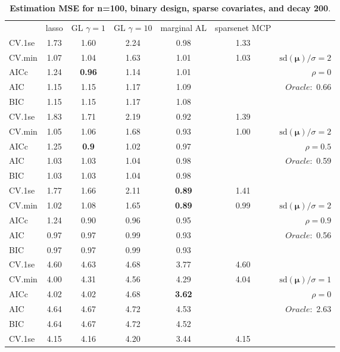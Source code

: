 \begin{table}\vspace{-.5cm}
\caption[l]{ { \bf Estimation MSE for n=100, binary design, 
sparse covariates, and  decay  200}.}
\vspace{-.5cm}
\footnotesize{}
\begin{center}
\begin{tabular}{l*{5}{c}|r}
& lasso & GL $\gamma=1$ & GL $\gamma=10$ & marginal AL & sparsenet MCP  & \\
 \cline{1-7}
CV.1se & 1.73 & 1.60 & 2.24 & 0.98 & 1.33 & \\
CV.min & 1.07 & 1.04 & 1.63 & 1.01 & 1.03 &  $\mathrm{sd}(\mathbf{\mu})/\sigma=2$ \\
AICc & 1.24 & {\bf 0.96} & 1.14 & 1.01 & & $\rho=0$ \\
AIC & 1.15 & 1.15 & 1.17 & 1.09 & &  \multirow{2}{*}{$Oracle: $ 0.66} \\
BIC & 1.15 & 1.15 & 1.17 & 1.08 & &  \\
 \hline 
CV.1se & 1.83 & 1.71 & 2.19 & 0.92 & 1.39 & \\
CV.min & 1.05 & 1.06 & 1.68 & 0.93 & 1.00 &  $\mathrm{sd}(\mathbf{\mu})/\sigma=2$ \\
AICc & 1.25 & {\bf 0.9} & 1.02 & 0.97 & & $\rho=0.5$ \\
AIC & 1.03 & 1.03 & 1.04 & 0.98 & &  \multirow{2}{*}{$Oracle: $ 0.59} \\
BIC & 1.03 & 1.03 & 1.04 & 0.98 & &  \\
 \hline 
CV.1se & 1.77 & 1.66 & 2.11 & {\bf 0.89} & 1.41 & \\
CV.min & 1.02 & 1.08 & 1.65 & {\bf 0.89} & 0.99 &  $\mathrm{sd}(\mathbf{\mu})/\sigma=2$ \\
AICc & 1.24 & 0.90 & 0.96 & 0.95 & & $\rho=0.9$ \\
AIC & 0.97 & 0.97 & 0.99 & 0.93 & &  \multirow{2}{*}{$Oracle: $ 0.56} \\
BIC & 0.97 & 0.97 & 0.99 & 0.93 & &  \\
 \hline 
CV.1se & 4.60 & 4.63 & 4.68 & 3.77 & 4.60 & \\
CV.min & 4.00 & 4.31 & 4.56 & 4.29 & 4.04 &  $\mathrm{sd}(\mathbf{\mu})/\sigma=1$ \\
AICc & 4.02 & 4.02 & 4.68 & {\bf 3.62} & & $\rho=0$ \\
AIC & 4.64 & 4.67 & 4.72 & 4.53 & &  \multirow{2}{*}{$Oracle: $ 2.63} \\
BIC & 4.64 & 4.67 & 4.72 & 4.52 & &  \\
 \hline 
CV.1se & 4.15 & 4.16 & 4.20 & 3.44 & 4.15 & \\

\end{tabular}
\end{center}
\end{table}
